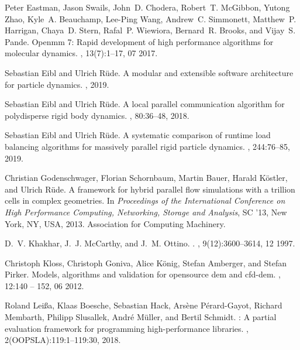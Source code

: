 \documentclass[Afour,sageh,times]{sagej}
\begin{document}
\begin{thebibliography}{99}
Peter Eastman, Jason Swails, John~D. Chodera, Robert~T. McGibbon, Yutong Zhao,
  Kyle~A. Beauchamp, Lee-Ping Wang, Andrew~C. Simmonett, Matthew~P. Harrigan,
  Chaya~D. Stern, Rafal~P. Wiewiora, Bernard~R. Brooks, and Vijay~S. Pande.
\newblock Openmm 7: Rapid development of high performance algorithms for
  molecular dynamics.
, 13(7):1--17, 07 2017.

Sebastian Eibl and Ulrich R{\"{u}}de.
\newblock A modular and extensible software architecture for particle dynamics.
, 2019.

Sebastian Eibl and Ulrich Rüde.
\newblock A local parallel communication algorithm for polydisperse rigid body
  dynamics.
, 80:36--48, 2018.

Sebastian Eibl and Ulrich Rüde.
\newblock A systematic comparison of runtime load balancing algorithms for
  massively parallel rigid particle dynamics.
, 244:76--85, 2019.

Christian Godenschwager, Florian Schornbaum, Martin Bauer, Harald K\"{o}stler,
  and Ulrich R\"{u}de.
\newblock A framework for hybrid parallel flow simulations with a trillion
  cells in complex geometries.
\newblock In {\em Proceedings of the International Conference on High
  Performance Computing, Networking, Storage and Analysis}, SC '13, New York,
  NY, USA, 2013. Association for Computing Machinery.

D.~V. Khakhar, J.~J. McCarthy, and J.~M. Ottino.
.
, 9(12):3600--3614, 12 1997.

Christoph Kloss, Christoph Goniva, Alice König, Stefan Amberger, and Stefan
  Pirker.
\newblock Models, algorithms and validation for opensource dem and cfd-dem.
, 12:140 -- 152, 06
  2012.

Roland Lei{\ss}a, Klaas Boesche, Sebastian Hack, Ars{\`{e}}ne
  P{\'{e}}rard{-}Gayot, Richard Membarth, Philipp Slusallek, Andr{\'{e}}
  M{\"{u}}ller, and Bertil Schmidt.
: A partial evaluation framework for programming
  high-performance libraries.
, 2({OOPSLA}):119:1--119:30, 2018.


\end{thebibliography}
\end{document}
